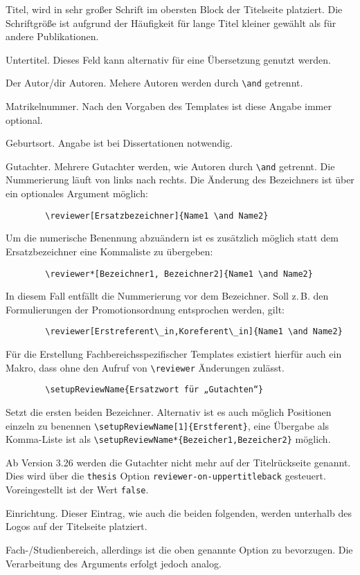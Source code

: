 \documentclass[
	german,%
	ruledheaders=chapter,%
	class=book,%
	thesis={%
			type=dr,
			dr=rernat
		},
	fontsize=11pt,%
	parskip=half-,%
	custommargins=true,%
	marginpar=false,%
	accentcolor=9c,%
]{tudapub}
\begin{document}
\begin{description}
	\item[title] Titel, wird in sehr großer Schrift im obersten Block der Titelseite platziert. Die Schriftgröße ist aufgrund der Häufigkeit für lange Titel kleiner gewählt als für andere Publikationen.
	\item[subtitle] Untertitel. Dieses Feld kann alternativ für eine Übersetzung genutzt werden.
	\item[author] Der Autor/dir Autoren. Mehere Autoren werden durch \verb+\and+ getrennt.
	\item[studentID] Matrikelnummer. Nach den Vorgaben des Templates ist diese Angabe immer optional.
	\item[birthplace] Geburtsort. Angabe ist bei Dissertationen notwendig.
	\item[reviewer] Gutachter. Mehrere Gutachter werden, wie Autoren durch \verb+\and+ getrennt. Die Nummerierung läuft von links nach rechts.
	      Die Änderung des Bezeichners ist über ein optionales Argument möglich:
\begin{verbatim}
        \reviewer[Ersatzbezeichner]{Name1 \and Name2}
\end{verbatim}
	      Um die numerische Benennung abzuändern ist es zusätzlich möglich statt dem Ersatzbezeichner eine Kommaliste zu übergeben:
\begin{verbatim}
        \reviewer*[Bezeichner1, Bezeichner2]{Name1 \and Name2}
\end{verbatim}
	      In diesem Fall entfällt die Nummerierung vor dem Bezeichner. Soll z.\,B. den Formulierungen der Promotionsordnung entsprochen werden, gilt:
\begin{verbatim}
        \reviewer[Erstreferent\_in,Koreferent\_in]{Name1 \and Name2}
\end{verbatim}
	      Für die Erstellung Fachbereichsspezifischer Templates existiert hierfür auch ein Makro, dass ohne den Aufruf von \verb+\reviewer+ Änderungen zulässt.
\begin{verbatim}
        \setupReviewName{Ersatzwort für „Gutachten“}
\end{verbatim}
	      Setzt die ersten beiden Bezeichner. Alternativ ist es auch möglich Positionen einzeln zu benennen \verb+\setupReviewName[1]{Erstferent}+, eine Übergabe als Komma-Liste ist als \verb+\setupReviewName*{Bezeicher1,Bezeicher2}+ möglich.

	      Ab Version 3.26 werden die Gutachter nicht mehr auf der Titelrückseite genannt. Dies wird über die \verb+thesis+ Option \verb+reviewer-on-uppertitleback+ gesteuert. Voreingestellt ist der Wert \verb+false+.
	\item[institution] Einrichtung. Dieser Eintrag, wie auch die beiden folgenden, werden unterhalb des Logos auf der Titelseite platziert.
	\item[department] Fach-/Studienbereich, allerdings ist die oben genannte Option zu bevorzugen. Die Verarbeitung des Arguments erfolgt jedoch analog.


\end{description}
\end{document}
